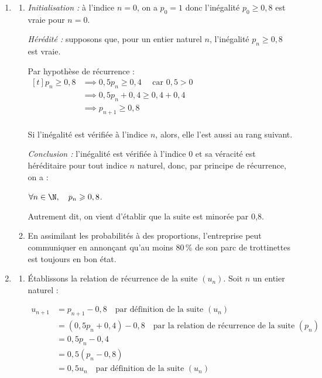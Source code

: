 \begin{enumerate}
$p_{n+1} = P(B_{n+1}) = P\Big(B_n \cap B_{n+1}\Big) + P\Big(\overline{B_n} \cap B_{n+1} \Big) = p_n \times 0,9 + (1-p_n) \times 0,4 = 0,9p_n + 0,4 - 0,4p_n $

Donc on a bien $p_{n+1} = 0,5p_n + 0,4$ : on a donc bien établi la relation de récurrence annoncée.

\item 
	\begin{enumerate}
		\item \emph{Initialisation :} à l'indice $n=0$, on a $p_0 = 1$ donc l'inégalité $p_0 \geqslant 0,8$ est vraie pour $n = 0$.

\emph{Hérédité :} supposons que, pour un entier naturel $n$, l'inégalité $p_n \geqslant 0,8$ est vraie.

Par hypothèse de récurrence : $\begin{aligned}[t] p_n \geqslant 0,8 &\implies 0,5p_n \geqslant 0,4 \quad \text{ car } 0,5 > 0\\
				&\implies 0,5p_n + 0,4 \geqslant 0,4 + 0,4\\
				&\implies p_{n+1} \geqslant 0,8\\ \end{aligned}$

Si l'inégalité est vérifiée à l'indice $n$, alors, elle l'est aussi au rang suivant.


\emph{Conclusion :} l'inégalité est vérifiée à l'indice 0 et sa véracité est héréditaire pour tout indice $n$ naturel, donc, par principe de récurrence, on a :

$\forall n \in \N, \quad p_n \geqslant 0,8$.

Autrement dit, on vient d'établir que la suite est minorée par 0,8.

		\item En assimilant les probabilités à des proportions, l'entreprise peut communiquer en annonçant qu'au moins 80\,\% de son parc de trottinettes est toujours en bon état.
\end{enumerate}
\item 
		\begin{enumerate}
			\item Établissons la relation de récurrence de la suite $\left(u_n\right)$. Soit $n$ un entier naturel :

$\begin{aligned} u_{n+1} &= p_{n+1} - 0,8 \quad \text{par définition de la suite } (u_n)\\
&= (0,5p_n + 0,4) - 0,8 \quad \text{par la relation de récurrence de la suite } (p_n)\\
&= 0,5p_n - 0,4\\
&= 0,5(p_n - 0,8)\\
&= 0,5u_n \quad \text{par définition de la suite } \left(u_n\right)\\ \end{aligned}$


\end{enumerate}
\end{enumerate}
